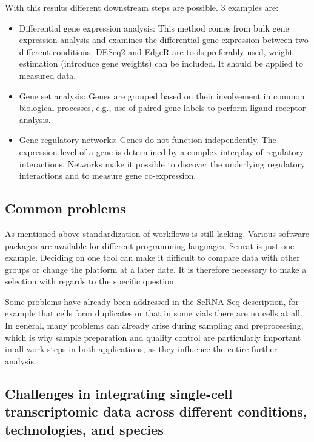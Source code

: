 \documentclass[a4paper, 10pt]{scrartcl}
\begin{document}
With this results different downstream steps are possible. 3 examples
are:

\begin{itemize}
\item
  Differential gene expression analysis: This method comes from bulk
  gene expression analysis and examines the differential gene expression
  between two different conditions. DESeq2 and EdgeR are tools
  preferably used, weight estimation (introduce gene weights) can be
  included. It should be applied to measured data.
\item
  Gene set analysis: Genes are grouped based on their involvement in
  common biological processes, e.g., use of paired gene labels to
  perform ligand-receptor analysis.
\item
  Gene regulatory networks: Genes do not function independently. The
  expression level of a gene is determined by a complex interplay of
  regulatory interactions. Networks make it possible to discover the
  underlying regulatory interactions and to measure gene co-expression.
\end{itemize}

\hypertarget{common-problems}{%
\subsection{Common problems}\label{common-problems}}

As mentioned above standardization of workflows is still lacking.
Various software packages are available for different programming
languages, Seurat is just one example. Deciding on one tool can make it
difficult to compare data with other groups or change the platform at a
later date. It is therefore necessary to make a selection with regards
to the specific question.

Some problems have already been addressed in the ScRNA Seq description,
for example that cells form duplicates or that in some vials there are
no cells at all. In general, many problems can already arise during
sampling and preprocessing, which is why sample preparation and quality
control are particularly important in all work steps in both
applications, as they influence the entire further analysis.

\hypertarget{challenges-in-integrating-single-cell-transcriptomic-data-across-different-conditions-technologies-and-species}{%
\subsection{Challenges in integrating single-cell transcriptomic data
across different conditions, technologies, and
species}\label{challenges-in-integrating-single-cell-transcriptomic-data-across-different-conditions-technologies-and-species}}
\end{document}
